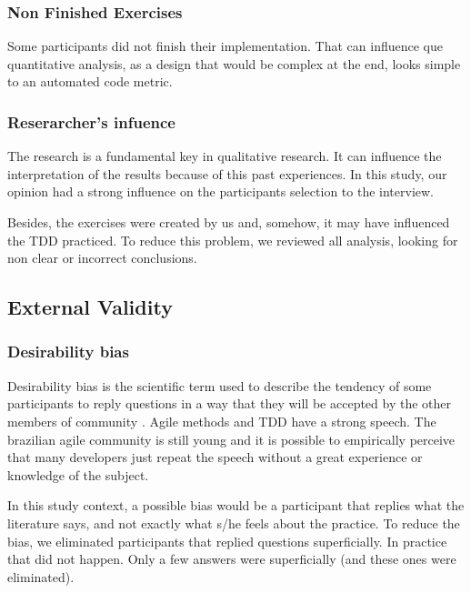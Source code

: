 \documentclass[conference]{IEEEtran}
\begin{document}
\begin{framed}
\begin{framed}
\subsubsection{Non Finished Exercises}

Some participants did not finish their implementation. That can influence que
quantitative analysis, as a design that would be complex at the end, looks simple
to an automated code metric.

\subsubsection{Reserarcher's infuence}

The research is a fundamental key in qualitative research. It can influence
the interpretation of the results because of this past experiences.
In this study, our opinion had a strong influence on the participants selection
to the interview.

Besides, the exercises were created by us and, somehow, it may have influenced
the TDD practiced. To reduce this problem, we reviewed all analysis, looking for
non clear or incorrect conclusions.


\subsection{External Validity}

\subsubsection{Desirability bias}

Desirability bias is the scientific term used to describe the tendency of some participants
to reply questions in a way that they will be accepted by the other members
of community \cite{crowne}.
Agile methods and TDD have a strong speech. The brazilian agile community is still
young and it is possible to empirically perceive that many developers just
repeat the speech without a great experience or knowledge of the subject.

In this study context, a possible bias would be a participant that replies
what the literature says, and not exactly what s/he feels about the practice.
To reduce the bias, we eliminated participants that replied questions superficially.
In practice that did not happen. Only a few answers were superficially (and these
ones were eliminated).


\end{framed}
\end{framed}
\end{document}
